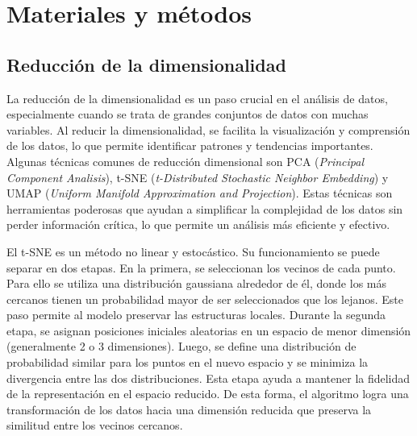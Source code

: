 \chapter{Materiales y métodos}
\label{cap1}
\section{Reducción de la dimensionalidad}
\label{c11}
\onehalfspacing


La reducción de la dimensionalidad es un paso crucial en el análisis de datos, especialmente cuando se trata de grandes conjuntos de datos con muchas variables. Al reducir la dimensionalidad, se facilita la visualización y comprensión de los datos, lo que permite identificar patrones y tendencias importantes. Algunas técnicas comunes de reducción dimensional son PCA (\textit{Principal Component Analisis}), t-SNE (\textit{t-Distributed Stochastic Neighbor Embedding}) y UMAP (\textit{Uniform Manifold Approximation and Projection}). Estas técnicas son herramientas poderosas que ayudan a simplificar la complejidad de los datos sin perder información crítica, lo que permite un análisis más eficiente y efectivo.

El t-SNE es un método no linear y estocástico. Su funcionamiento se puede separar en dos etapas. En la primera, se seleccionan los vecinos de cada punto. Para ello se utiliza una distribución gaussiana alrededor de él, donde los más cercanos tienen un probabilidad mayor de ser seleccionados que los lejanos. Este paso permite al modelo preservar las estructuras locales. Durante la segunda etapa, se asignan posiciones iniciales aleatorias en un espacio de menor dimensión (generalmente 2 o 3 dimensiones). Luego, se define una distribución de probabilidad similar para los puntos en el nuevo espacio y se minimiza la divergencia entre las dos distribuciones. Esta etapa ayuda a mantener la fidelidad de la representación en el espacio reducido. De esta forma, el algoritmo logra una transformación de los datos hacia una dimensión reducida que preserva la similitud entre los vecinos cercanos.

